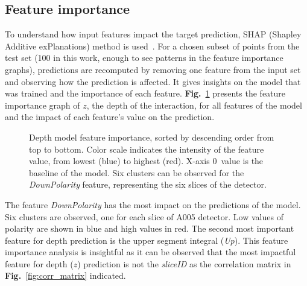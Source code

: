 \subsection{Feature importance}

To understand how input features impact the target prediction, SHAP (Shapley Additive exPlanations) method is used~\cite{lundberg2017}. For a chosen subset of points from the test set (100 in this work, enough to see patterns in the feature importance graphs), predictions are recomputed by removing one feature from the input set and observing how the prediction is affected. It gives insights on the model that was trained and the importance of each feature. \textbf{Fig.}~\ref{fig:detph_treeSHAP} presents the feature importance graph of $z$, the depth of the interaction, for all features of the model and the impact of each feature's value on the prediction.

\begin{figure}
\centering
{}
\caption{Depth model feature importance, sorted by descending order from top to bottom. Color scale indicates the intensity of the feature value, from lowest (blue) to highest (red). X-axis 0~value is the baseline of the model. Six clusters can be observed for the \textit{DownPolarity} feature, representing the six slices of the detector.} 
\label{fig:detph_treeSHAP}       %
\end{figure}

The feature \textit{DownPolarity} has the most impact on the predictions of the model. Six clusters are observed, one for each slice of A005 detector. Low values of polarity are shown in blue and high values in red. The second most important feature for depth prediction is the upper segment integral (\textit{Up}). This feature importance analysis is insightful as it can be observed that the most impactful feature for depth ($z$) prediction is not the \textit{sliceID} as the correlation matrix in \textbf{Fig.}~\ref{fig:corr_matrix} indicated.

